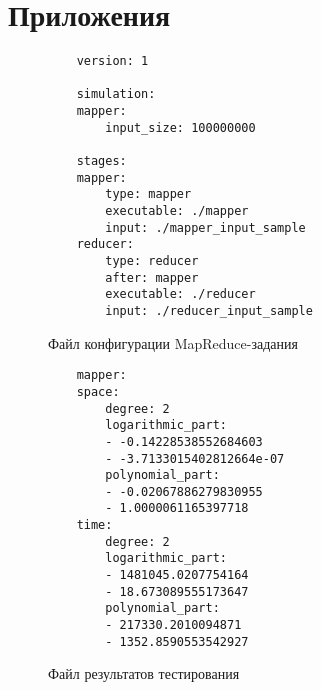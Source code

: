 \documentclass[../../thesis.tex]{subfile}
\begin{document}
    \section{Приложения}

    \begin{figure}[H]
    \begin{verbatim}
    version: 1

    simulation:
    mapper:
        input_size: 100000000

    stages:
    mapper:
        type: mapper
        executable: ./mapper
        input: ./mapper_input_sample
    reducer:
        type: reducer
        after: mapper
        executable: ./reducer
        input: ./reducer_input_sample
    \end{verbatim}

    \caption{Файл конфигурации MapReduce-задания}
    \label{lst:specfile}
    \end{figure}
    
    \begin{figure}[H]
    \begin{verbatim}
    mapper:
    space:
        degree: 2
        logarithmic_part:
        - -0.14228538552684603
        - -3.7133015402812664e-07
        polynomial_part:
        - -0.02067886279830955
        - 1.0000061165397718
    time:
        degree: 2
        logarithmic_part:
        - 1481045.0207754164
        - 18.673089555173647
        polynomial_part:
        - 217330.2010094871
        - 1352.8590553542927
    \end{verbatim}
    \caption{Файл результатов тестирования}
    \label{lst:resultfile}
    \end{figure}
\end{document}

